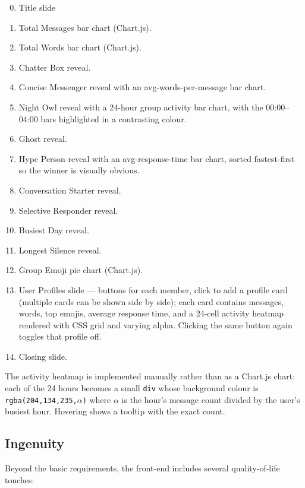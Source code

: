 \documentclass[12pt]{article}
\begin{document}
\begin{enumerate}
    \setcounter{enumi}{-1}
    \item Title slide
    \item Total Messages bar chart (Chart.js).
    \item Total Words bar chart (Chart.js).
    \item Chatter Box reveal.
    \item Concise Messenger reveal with an avg-words-per-message bar chart.
    \item Night Owl reveal with a 24-hour group activity bar chart, with
    the 00:00--04:00 bars highlighted in a contrasting colour.
    \item Ghost reveal.
    \item Hype Person reveal with an avg-response-time bar chart, sorted
    fastest-first so the winner is visually obvious.
    \item Conversation Starter reveal.
    \item Selective Responder reveal.
    \item Busiest Day reveal.
    \item Longest Silence reveal.
    \item Group Emoji pie chart (Chart.js).
    \item User Profiles slide --- buttons for each member, click to add a
    profile card (multiple cards can be shown side by side); each card
    contains messages, words, top emojis, average response time, and a
    24-cell activity heatmap rendered with CSS grid and varying alpha.
    Clicking the same button again toggles that profile off.
    \item Closing slide.
\end{enumerate}

The activity heatmap is implemented manually rather than as a Chart.js chart:
each of the 24 hours becomes a small \texttt{div} whose background colour is
\texttt{rgba(204,134,235,$\alpha$)} where $\alpha$ is the hour's message count
divided by the user's busiest hour. Hovering shows a tooltip with the exact
count.

\subsection{Ingenuity}

Beyond the basic requirements, the front-end includes several quality-of-life
touches:
\end{document}
